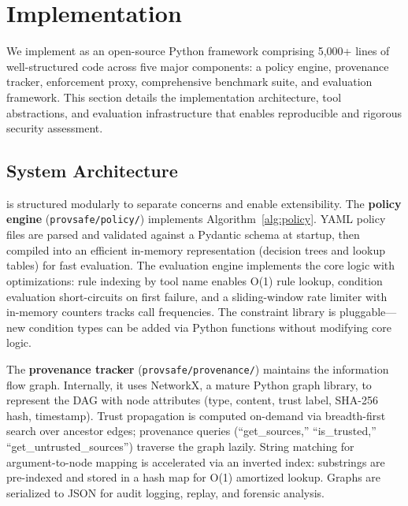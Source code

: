 \section{Implementation}
\label{sec:impl}

We implement \sys{} as an open-source Python framework comprising 5,000+ lines of well-structured code across five major components: a policy engine, provenance tracker, enforcement proxy, comprehensive benchmark suite, and evaluation framework. This section details the implementation architecture, tool abstractions, and evaluation infrastructure that enables reproducible and rigorous security assessment.

\subsection{System Architecture}

\sys{} is structured modularly to separate concerns and enable extensibility. The \textbf{policy engine} (\texttt{provsafe/policy/}) implements Algorithm~\ref{alg:policy}. YAML policy files are parsed and validated against a Pydantic schema at startup, then compiled into an efficient in-memory representation (decision trees and lookup tables) for fast evaluation. The evaluation engine implements the core logic with optimizations: rule indexing by tool name enables O(1) rule lookup, condition evaluation short-circuits on first failure, and a sliding-window rate limiter with in-memory counters tracks call frequencies. The constraint library is pluggable—new condition types can be added via Python functions without modifying core logic.

The \textbf{provenance tracker} (\texttt{provsafe/provenance/}) maintains the information flow graph. Internally, it uses NetworkX, a mature Python graph library, to represent the DAG with node attributes (type, content, trust label, SHA-256 hash, timestamp). Trust propagation is computed on-demand via breadth-first search over ancestor edges; provenance queries (``get\_sources,'' ``is\_trusted,'' ``get\_untrusted\_sources'') traverse the graph lazily. String matching for argument-to-node mapping is accelerated via an inverted index: substrings are pre-indexed and stored in a hash map for O(1) amortized lookup. Graphs are serialized to JSON for audit logging, replay, and forensic analysis.


